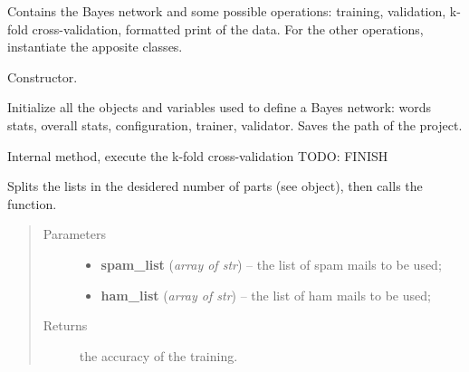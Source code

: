 \documentclass[letterpaper,10pt,english]{sphinxmanual}
\begin{document}
\begin{fulllineitems}
\label{index:naive_bayes.Bayes}
Contains the Bayes network and some possible operations: training,
validation, k-fold cross-validation, formatted print of the data.
For the other operations, instantiate the apposite classes.

\begin{fulllineitems}
\label{index:naive_bayes.Bayes.__init__}
Constructor.

Initialize all the objects and variables used to define a Bayes network:
words stats, overall stats, configuration, trainer, validator.
Saves the path of the project.

\end{fulllineitems}


\begin{fulllineitems}
\label{index:naive_bayes.Bayes._k_fold_cross_validation}
Internal method, execute the k-fold cross-validation TODO: FINISH

Splits the lists in the desidered number of parts
(see {\hyperref[index:config.Config]{}} object),
then calls the {\hyperref[index:trainer.Trainer.train]{}} function.
\begin{quote}\begin{description}
\item[{Parameters}] \leavevmode\begin{itemize}
\item {} 
\textbf{spam\_list} (\emph{array of str}) -- the list of spam mails to be used;

\item {} 
\textbf{ham\_list} (\emph{array of str}) -- the list of ham mails to be used;

\end{itemize}

\item[{Returns}] \leavevmode
the accuracy of the training.

\end{description}\end{quote}


\end{fulllineitems}
\end{fulllineitems}
\end{document}
